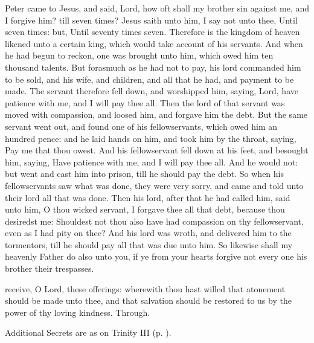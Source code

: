  Peter came to Jesus, and said, Lord, how oft shall my brother sin against me, and I forgive him? till seven times? Jesus saith unto him, I say not unto thee, Until seven times: but, Until seventy times seven. Therefore is the kingdom of heaven likened unto a certain king, which would take account of his servants. And when he had begun to reckon, one was brought unto him, which owed him ten thousand talents. But forasmuch as he had not to pay, his lord commanded him to be sold, and his wife, and children, and all that he had, and payment to be made. The servant therefore fell down, and worshipped him, saying, Lord, have patience with me, and I will pay thee all. Then the lord of that servant was moved with compassion, and loosed him, and forgave him the debt. But the same servant went out, and found one of his fellowservants, which owed him an hundred pence: and he laid hands on him, and took him by the throat, saying, Pay me that thou owest. And his fellowservant fell down at his feet, and besought him, saying, Have patience with me, and I will pay thee all. And he would not: but went and cast him into prison, till he should pay the debt. So when his fellowservants saw what was done, they were very sorry, and came and told unto their lord all that was done. Then his lord, after that he had called him, said unto him, O thou wicked servant, I forgave thee all that debt, because thou desiredst me: Shouldest not thou also have had compassion on thy fellowservant, even as I had pity on thee? And his lord was wroth, and delivered him to the tormentors, till he should pay all that was due unto him. So likewise shall my heavenly Father do also unto you, if ye from your hearts forgive not every one his brother their trespasses.


\secret
{} receive, O Lord, these offerings: wherewith thou hast willed that atonement should be made unto thee, and that salvation should be restored to us by the power of thy loving kindness. Through.
\begin{rubric}
    Additional Secrets are as on Trinity III (p. \pageref{TrinityIII}).
\end{rubric}


